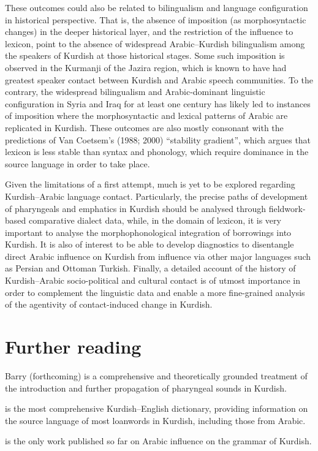 \documentclass[output=paper]{langsci/langscibook}
\begin{document}
These outcomes could also be related to bilingualism and language configuration in historical perspective. That is, the absence of imposition (as morphosyntactic changes) in the deeper historical layer, and the restriction of the influence to lexicon, point to the absence of widespread Arabic–Kurdish bilingualism among the speakers of Kurdish at those historical stages. Some such imposition is observed in the Kurmanji of the Jazira region, which is known to have had greatest speaker contact between Kurdish and Arabic speech communities. To the contrary, the widespread bilingualism and Arabic-dominant linguistic configuration in Syria and Iraq for at least one century has likely led to instances of imposition where the morphosyntactic and lexical patterns of Arabic are replicated in Kurdish. These outcomes are also mostly consonant with the predictions of Van Coetsem’s (1988; 2000) “stability gradient”, which argues that lexicon is less stable than syntax and phonology, which require dominance in the source language in order to take place.    

Given the limitations of a first attempt, much is yet to be explored regarding Kurdish–Arabic language contact. Particularly, the precise paths of development of pharyngeals and emphatics in Kurdish should be analysed through fieldwork-based comparative dialect data, while, in the domain of lexicon, it is very important to analyse the morphophonological integration of borrowings into Kurdish. It is also of interest to be able to develop diagnostics to disentangle direct Arabic influence on Kurdish from influence via other major languages such as Persian and Ottoman Turkish. Finally, a detailed account of the history of Kurdish–Arabic socio-political and cultural contact is of utmost importance in order to complement the linguistic data and enable a more fine-grained analysis of the agentivity of contact-induced change in Kurdish.      

\section*{Further reading}
Barry (forthcoming) is a comprehensive and theoretically grounded treatment of the introduction and further propagation of pharyngeal sounds in Kurdish. 

\citet{Chyet2003} is the most comprehensive Kurdish–English dictionary,  providing information on the source language of most loanwords in Kurdish, including those from Arabic. 

\citet{Tsabolov1994} is the only work published so far on Arabic influence on the grammar of Kurdish. 
\end{document}
